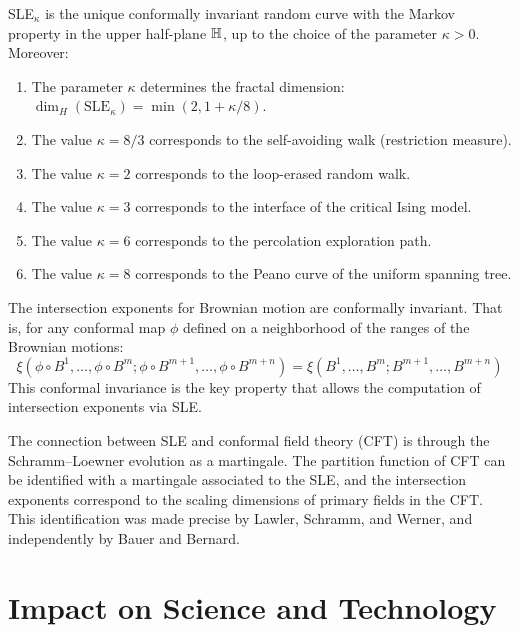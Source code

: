 \begin{theorem}
SLE$_\kappa$ is the unique conformally invariant random curve with the Markov property in the upper half-plane $\H$, up to the choice of the parameter $\kappa > 0$. Moreover:
\begin{enumerate}
    \item The parameter $\kappa$ determines the fractal dimension: $\dim_H(\text{SLE}_\kappa) = \min(2, 1 + \kappa/8)$.
    \item The value $\kappa = 8/3$ corresponds to the self-avoiding walk (restriction measure).
    \item The value $\kappa = 2$ corresponds to the loop-erased random walk.
    \item The value $\kappa = 3$ corresponds to the interface of the critical Ising model.
    \item The value $\kappa = 6$ corresponds to the percolation exploration path.
    \item The value $\kappa = 8$ corresponds to the Peano curve of the uniform spanning tree.
\end{enumerate}
\end{theorem}

\begin{theorem}
The intersection exponents for Brownian motion are conformally invariant. That is, for any conformal map $\phi$ defined on a neighborhood of the ranges of the Brownian motions:
\[
\xi(\phi \circ B^1, \ldots, \phi \circ B^m; \phi \circ B^{m+1}, \ldots, \phi \circ B^{m+n}) = \xi(B^1, \ldots, B^m; B^{m+1}, \ldots, B^{m+n})
\]
This conformal invariance is the key property that allows the computation of intersection exponents via SLE.
\end{theorem}

\begin{remark}
The connection between SLE and conformal field theory (CFT) is through the Schramm--Loewner evolution as a martingale. The partition function of CFT can be identified with a martingale associated to the SLE, and the intersection exponents correspond to the scaling dimensions of primary fields in the CFT. This identification was made precise by Lawler, Schramm, and Werner, and independently by Bauer and Bernard.
\end{remark}

\section{Impact on Science and Technology}

